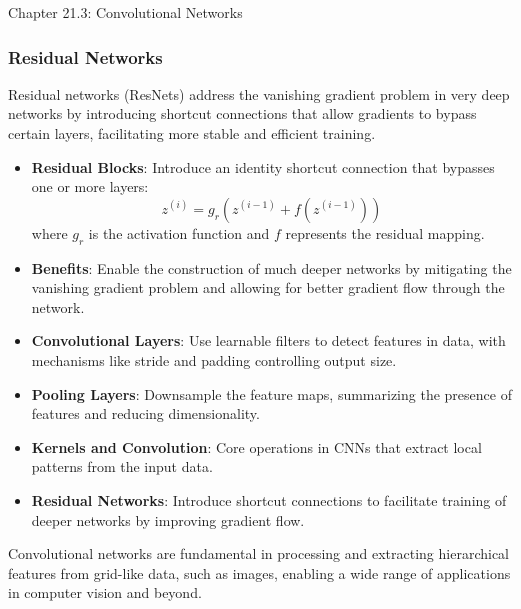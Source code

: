 \begin{notes}{Chapter 21.3: Convolutional Networks}
\begin{highlight}
    \end{highlight}
    
    \subsubsection*{Residual Networks}
    
    Residual networks (ResNets) address the vanishing gradient problem in very deep networks by introducing shortcut connections that allow gradients to bypass certain layers, facilitating more stable and 
    efficient training.
    
    \begin{highlight}
    
        \begin{itemize}
            \item \textbf{Residual Blocks}: Introduce an identity shortcut connection that bypasses one or more layers:
            \[
            z^{(i)} = g_r(z^{(i-1)} + f(z^{(i-1)}))
            \]
            where $g_r$ is the activation function and $f$ represents the residual mapping.
            \item \textbf{Benefits}: Enable the construction of much deeper networks by mitigating the vanishing gradient problem and allowing for better gradient flow through the network.
        \end{itemize}
    
    \end{highlight}
    
    \begin{highlight}
    
        \begin{itemize}
            \item \textbf{Convolutional Layers}: Use learnable filters to detect features in data, with mechanisms like stride and padding controlling output size.
            \item \textbf{Pooling Layers}: Downsample the feature maps, summarizing the presence of features and reducing dimensionality.
            \item \textbf{Kernels and Convolution}: Core operations in CNNs that extract local patterns from the input data.
            \item \textbf{Residual Networks}: Introduce shortcut connections to facilitate training of deeper networks by improving gradient flow.
        \end{itemize}
    
        Convolutional networks are fundamental in processing and extracting hierarchical features from grid-like data, such as images, enabling a wide range of applications in computer vision and beyond.
    
    \end{highlight}
\end{notes}

